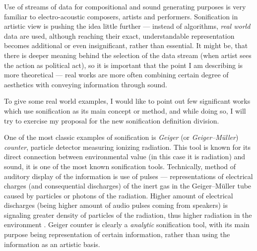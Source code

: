 \documentclass[12pt,a4paper,oneside]{report}
\begin{document}
Use of streams of data for compositional and sound generating purposes is very familiar to electro-acoustic composers, artists and performers. Sonification in artistic view is pushing the idea little further --- instead of algorithms, \emph{real world} data are used, although reaching their exact, understandable representation becomes additional or even insignificant, rather than essential. It might be, that there is deeper meaning behind the selection of the data stream (when artist sees the action as political act), so it is important that the point I am describing is more theoretical --- real works are more often combining certain degree of aesthetics with conveying information through sound.



To give some real world examples, I would like to point out few significant works which use sonification as its main concept or method, and while doing so, I will try to exercise my proposal for the new sonification definition division.

One of the most classic examples of sonification is \emph{Geiger} (or \emph{Geiger–Müller}) \emph{counter}, particle detector measuring ionizing radiation. This tool is known for its direct connection between environmental value (in this case it is radiation) and sound, it is one of the most known sonification tools. Technically, method of auditory display of the information is use of pulses --- representations of electrical charges (and consequential discharges) of the inert gas in the Geiger–Müller tube caused by particles or photons of the radiation. Higher amount of electrical discharges (being higher amount of audio pulses coming from speakers) is signaling greater density of particles of the radiation, thus higher radiation in the environment \cite{Knoll2010}. Geiger counter is clearly a \emph{analytic} sonification tool, with its main purpose being representation of certain information, rather than using the information as an artistic basis.
\end{document}

